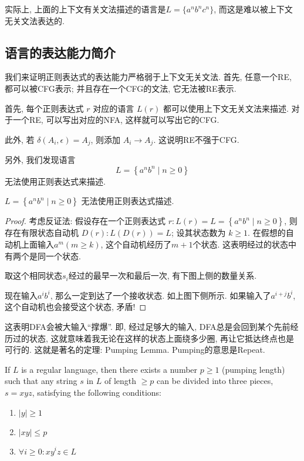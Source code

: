 \documentclass{ctexart}
\begin{document}
实际上, 上面的上下文有关文法描述的语言是$L=\{a^nb^nc^n\}$, 而这是难以被上下文无关文法表达的. 

\subsection{语言的表达能力简介}

我们来证明正则表达式的表达能力严格弱于上下文无关文法. 首先, 任意一个RE, 都可以被CFG表示; 并且存在一个CFG的文法, 它无法被RE表示. 

首先, 每个正则表达式 $r$ 对应的语言 $L(r)$ 都可以使用上下文无关文法来描述. 对于一个RE, 可以写出对应的NFA, 这样就可以写出它的CFG. 


此外, 若 $\delta\left(A_i, \epsilon\right)=A_j$, 则添加 $A_i \rightarrow A_j$. 这说明RE不强于CFG. 

另外, 我们发现语言
$$
L=\left\{a^n b^n \mid n \geq 0\right\}
$$
无法使用正则表达式来描述.

\begin{theorem}
    $L=\left\{a^n b^n \mid n \geq 0\right\}$ 无法使用正则表达式描述. 
\end{theorem}

\begin{proof}
    考虑反证法: 假设存在一个正则表达式 $r: L(r)=L=\left\{a^n b^n \mid n \geq 0\right\}$, 则存在有限状态自动机 $D(r): L(D(r))=L$; 设其状态数为 $k \geq 1$. 在假想的自动机上面输入$a^m(m \geq k)$, 这个自动机经历了$m+1$个状态. 这表明经过的状态中有两个是同一个状态. 

    取这个相同状态$s_i$经过的最早一次和最后一次, 有下图上侧的数量关系. 
    

    现在输入$a^ib^i$, 那么一定到达了一个接收状态. 如上图下侧所示. 如果输入了$a^{i+j}b^i$, 这个自动机也会接受这个状态, 矛盾! 
\end{proof}

这表明DFA会被大输入``撑爆''. 即, 经过足够大的输入, DFA总是会回到某个先前经历过的状态, 这就意味着我无论在这样的状态上面绕多少圈, 再让它抵达终点也是可行的. 这就是著名的定理: Pumping Lemma. Pumping的意思是Repeat. 

\begin{theorem}
    If $L$ is a regular language, then there exists a number $p \geq 1$ (pumping length) such that any string $s$ in $L$ of length $\geq p$ can be divided into three pieces, $s=x y z$, satisfying the following conditions:
\begin{enumerate}
    \item $|y| \geq 1$ 
    \item $|x y| \leq p$
    \item $\forall i \geq 0: x y^i z \in L$ 
\end{enumerate}

\end{theorem}
\end{document}
